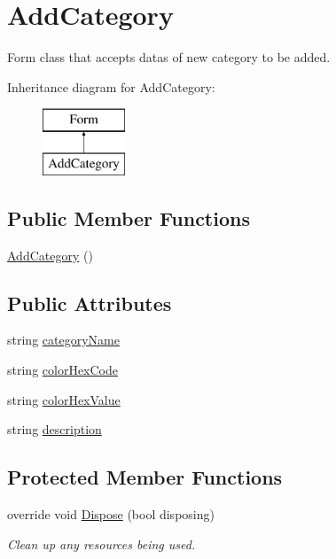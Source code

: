 \hypertarget{classWildlifeTrackingApp_1_1AddCategory}{}\section{Add\+Category}
\label{classWildlifeTrackingApp_1_1AddCategory}


Form class that accepts datas of new category to be added.  


Inheritance diagram for Add\+Category\+:\begin{figure}[H]
\begin{center}
\leavevmode
\includegraphics[height=2.000000cm]{classWildlifeTrackingApp_1_1AddCategory}
\end{center}
\end{figure}
\subsection*{Public Member Functions}
\begin{DoxyCompactItemize}
\item 
\hyperlink{classWildlifeTrackingApp_1_1AddCategory_af7eaf46f7b2758e1c6af7c0290322940}{Add\+Category} ()
\end{DoxyCompactItemize}
\subsection*{Public Attributes}
\begin{DoxyCompactItemize}
\item 
string \hyperlink{classWildlifeTrackingApp_1_1AddCategory_a1eca787c85e1bc45b49bbd281d4106fd}{category\+Name}
\item 
string \hyperlink{classWildlifeTrackingApp_1_1AddCategory_acccfd1715ce280fb9d9171cd4dfd387a}{color\+Hex\+Code}
\item 
string \hyperlink{classWildlifeTrackingApp_1_1AddCategory_ae96d6391386605736c8c89605e7258b6}{color\+Hex\+Value}
\item 
string \hyperlink{classWildlifeTrackingApp_1_1AddCategory_a23af17c78302b71c14ef38ea40b8d1d7}{description}
\end{DoxyCompactItemize}
\subsection*{Protected Member Functions}
\begin{DoxyCompactItemize}
\item 
override void \hyperlink{classWildlifeTrackingApp_1_1AddCategory_a849c3c7f8d08104f0cdb46bee9fe6389}{Dispose} (bool disposing)
\begin{DoxyCompactList}\small\item\em Clean up any resources being used. \end{DoxyCompactList}\end{DoxyCompactItemize}

